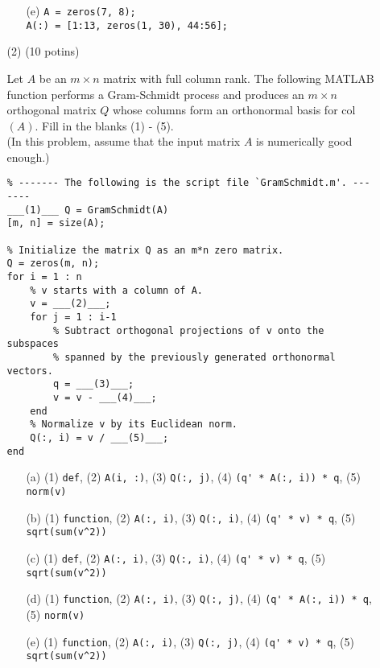 \documentclass[11pt,a4paper]{article}
\begin{document}
\begin{enumerate}
\begin{enumerate}
\begin{itemize}
        \item[(e)] 
        \verb"A = zeros(7, 8);"\\
        \verb"A(:) = [1:13, zeros(1, 30), 44:56];"
    \end{itemize}

    \vspace{3mm}
    \newpage

    \item[(2)] (10 potins)
    
    \vspace{1mm}
    
    Let $A$ be an $m \times n$ matrix with full column rank. 
    The following MATLAB function performs a Gram-Schmidt process and produces 
    an $m \times n$ orthogonal matrix $Q$ whose columns form an orthonormal basis for col$(A)$. 
    Fill in the blanks (1) - (5).\\
    (In this problem, assume that the input matrix $A$ is numerically good enough.)

    \vspace{2mm}

    \begin{verbatim}
% ------- The following is the script file `GramSchmidt.m'. -------
___(1)___ Q = GramSchmidt(A)
[m, n] = size(A);

% Initialize the matrix Q as an m*n zero matrix.
Q = zeros(m, n);
for i = 1 : n
    % v starts with a column of A.
    v = ___(2)___;
    for j = 1 : i-1
        % Subtract orthogonal projections of v onto the subspaces
        % spanned by the previously generated orthonormal vectors.
        q = ___(3)___;
        v = v - ___(4)___;
    end
    % Normalize v by its Euclidean norm.
    Q(:, i) = v / ___(5)___;
end
    \end{verbatim}

    \begin{itemize}
        \item[(a)]
            (1) \verb"def", (2) \verb"A(i, :)", (3) \verb"Q(:, j)", (4) \verb"(q' * A(:, i)) * q", (5) \verb"norm(v)"
        \item[(b)]
            (1) \verb"function", (2) \verb"A(:, i)", (3) \verb"Q(:, i)", (4) \verb"(q' * v) * q", (5) \verb"sqrt(sum(v^2))"
        \item[(c)]
            (1) \verb"def", (2) \verb"A(:, i)", (3) \verb"Q(:, i)", (4) \verb"(q' * v) * q", (5) \verb"sqrt(sum(v^2))"
        \item[(d)]
            (1) \verb"function", (2) \verb"A(:, i)", (3) \verb"Q(:, j)", (4) \verb"(q' * A(:, i)) * q", (5) \verb"norm(v)"
            \item[(e)]
            (1) \verb"function", (2) \verb"A(:, i)", (3) \verb"Q(:, j)", (4) \verb"(q' * v) * q", (5) \verb"sqrt(sum(v^2))"
        \end{itemize}
        
    \end{enumerate}
    
\end{enumerate}
\end{document}
